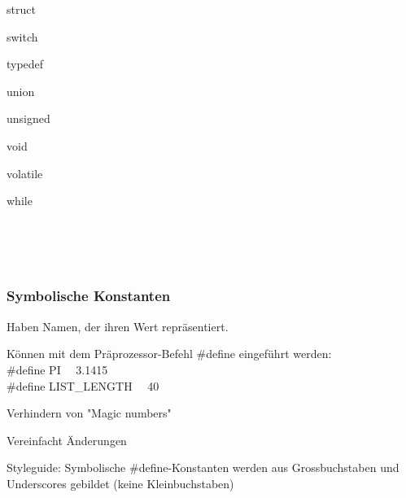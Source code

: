  			\hspace*{0.5 cm}
 			\begin{minipage}[t]{6 cm}
	 			\begin{compactitem}
	 			 	\item struct 			 	
	 			 	\item switch 			 	
	 			 	\item typedef 			 	
	 			 	\item union 			 	
	 			 	\item unsigned 			 	
	 			 	\item void 			 	
	 			 	\item volatile		 	
	 			 	\item while
	 			\end{compactitem}
	 		\end{minipage}
	 		\\\\\\
	 		\begin{minipage}[t]{8 cm}
		 		\subsubsection{Symbolische Konstanten}
		 			Haben Namen, der ihren Wert repräsentiert.
		 			\begin{compactitem}
		 				\item Können mit dem Präprozessor-Befehl \#define eingeführt werden:\\
		 				\#define PI \ \ 3.1415\\
		 				\#define LIST\_LENGTH \ \ 40
		 				\item Verhindern von "Magic numbers"
		 				\item Vereinfacht Änderungen
		 				\item Styleguide: Symbolische \#define-Konstanten werden aus Grossbuchstaben und Underscores gebildet (keine Kleinbuchstaben) 			 	
		 			\end{compactitem}
		 	\end{minipage}
		 	\hspace*{1.0 cm}
